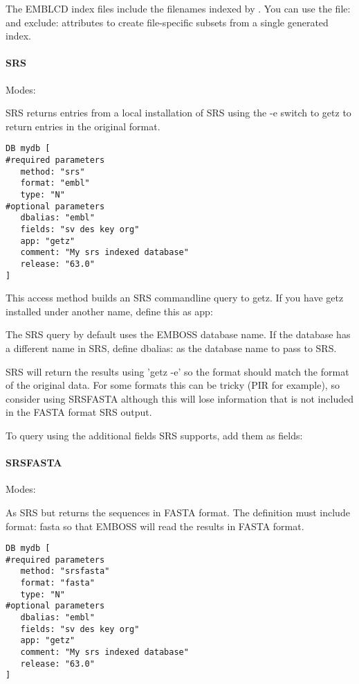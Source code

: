 \documentclass{report}
\begin{document}
The EMBLCD index files include the filenames indexed by
. You can use the file: and exclude: attributes to
create file-specific subsets from a single  generated
index.

\paragraph{SRS}\par\noindent
Modes: \par\noindent SRS returns entries from a local
installation of SRS using the -e switch to getz to return entries in
the original format.

\begin{verbatim}
DB mydb [
#required parameters
   method: "srs"
   format: "embl"
   type: "N"
#optional parameters
   dbalias: "embl"
   fields: "sv des key org"
   app: "getz"
   comment: "My srs indexed database"
   release: "63.0"
]
\end{verbatim}

This access method builds an SRS commandline query to getz. If you
have getz installed under another name, define this as app:

The SRS query by default uses the EMBOSS database name. If the
database has a different name in SRS, define dbalias: as the database
name to pass to SRS.

SRS will return the results using 'getz -e' so the format should match
the format of the original data. For some formats this can be tricky
(PIR for example), so consider using SRSFASTA although this will lose
information that is not included in the FASTA format SRS output.

To query using the additional fields SRS supports, add them as fields:

\paragraph{SRSFASTA}\par\noindent
Modes: \par\noindent
As SRS but returns the sequences in FASTA format. The definition must
include format: fasta so that EMBOSS will read the results in FASTA
format.

\begin{verbatim}
DB mydb [
#required parameters
   method: "srsfasta"
   format: "fasta"
   type: "N"
#optional parameters
   dbalias: "embl"
   fields: "sv des key org"
   app: "getz"
   comment: "My srs indexed database"
   release: "63.0"
]
\end{verbatim}
\end{document}
